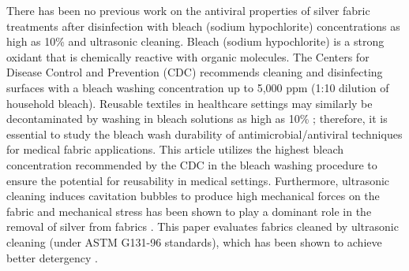 \documentclass[journal=jacsat,manuscript=article]{achemso}
\begin{document}


There has been no previous work on the 
antiviral properties of silver fabric treatments after disinfection with bleach (sodium hypochlorite) concentrations as high as 10\% and ultrasonic cleaning.  
Bleach (sodium hypochlorite) is a strong oxidant that is chemically reactive with organic molecules. \cite{eleni:2013,farr:2003} %
The Centers for Disease Control and Prevention (CDC) recommends cleaning and disinfecting surfaces with a bleach washing concentration up to 5,000 ppm (1:10 dilution of household bleach).\cite{cdc:1987}
Reusable textiles in healthcare settings may similarly be decontaminated by washing in bleach solutions as high as 10\% \cite{Cintas,cdc:1987}; therefore, it is essential to study the bleach wash durability of antimicrobial/antiviral techniques for medical fabric applications. 
This article utilizes the highest bleach concentration recommended by the CDC in the bleach washing procedure to ensure the potential for reusability in medical settings. 
Furthermore, ultrasonic cleaning induces cavitation bubbles to
produce high mechanical forces on the fabric \cite{Fuchs:15} and
mechanical stress has %
been shown to play a dominant role in the removal of silver from fabrics
\cite{geranio:2009}. This paper evaluates fabrics cleaned by ultrasonic cleaning (under 
ASTM G131-96 standards), 
which has been shown to 
achieve better detergency
\cite{Gallego-juarez:10}.
\end{document}
